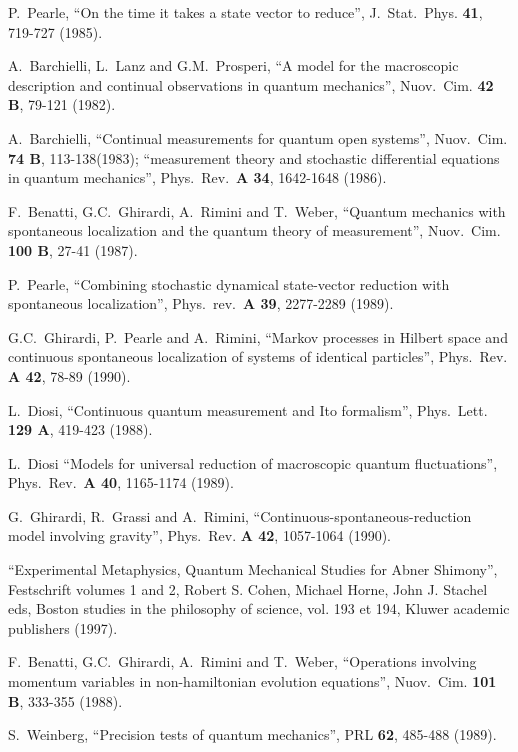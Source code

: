 \documentclass[12pt,onecolumn]{article}%
\begin{document}
\begin{thebibliography}{999}
P.\ Pearle, ``On the time it takes a state vector to
reduce'', J.\ Stat.\ Phys. \textbf{41}, 719-727 (1985).

A.\ Barchielli, L.\ Lanz and G.M.\ Prosperi, ``A model for the
macroscopic description and continual observations in quantum mechanics'',
Nuov.\ Cim. \textbf{42 B}, 79-121 (1982).

A.\ Barchielli, ``Continual measurements for quantum open
systems'', Nuov.\ Cim. \textbf{74 B}, 113-138(1983); ``measurement theory and
stochastic differential equations in quantum mechanics'',
Phys.\ Rev.\ \textbf{A 34}, 1642-1648 (1986).

F.\ Benatti, G.C.\ Ghirardi, A.\ Rimini and T.\ Weber,
``Quantum mechanics with spontaneous localization and the quantum theory of
measurement'', Nuov.\ Cim. \textbf{100 B}, 27-41 (1987).

P.\ Pearle, ``Combining stochastic dynamical state-vector
reduction with spontaneous localization'', Phys.\ rev.\ \textbf{A 39},
2277-2289 (1989).

G.C.\ Ghirardi, P.\ Pearle and A.\ Rimini, ``Markov processes in
Hilbert space and continuous spontaneous localization of systems of identical
particles'', Phys.\ Rev. \textbf{A 42}, 78-89 (1990).

L.\ Diosi, ``Continuous quantum measurement and Ito
formalism'', Phys.\ Lett. \textbf{129 A}, 419-423 (1988).

L.\ Diosi ``Models for universal reduction of macroscopic
quantum fluctuations'', Phys.\ Rev.\ \textbf{A 40}, 1165-1174 (1989).

G.\ Ghirardi, R.\ Grassi and A.\ Rimini,
``Continuous-spontaneous-reduction model involving gravity'', Phys.\ Rev.
\textbf{A 42}, 1057-1064 (1990).

``Experimental Metaphysics, Quantum Mechanical
Studies for Abner Shimony'', Festschrift volumes 1 and 2, Robert S. Cohen,
Michael Horne, John J. Stachel eds, Boston studies in the philosophy of
science, vol. 193 et 194, Kluwer academic publishers (1997).

F.\ Benatti, G.C.\ Ghirardi, A.\ Rimini and T.\ Weber,
``Operations involving momentum variables in non-hamiltonian evolution
equations'', Nuov.\ Cim. \textbf{101 B}, 333-355 (1988).

S.\ Weinberg, ``Precision tests of quantum mechanics'', PRL
\textbf{62}, 485-488 (1989).


\end{thebibliography}
\end{document}

